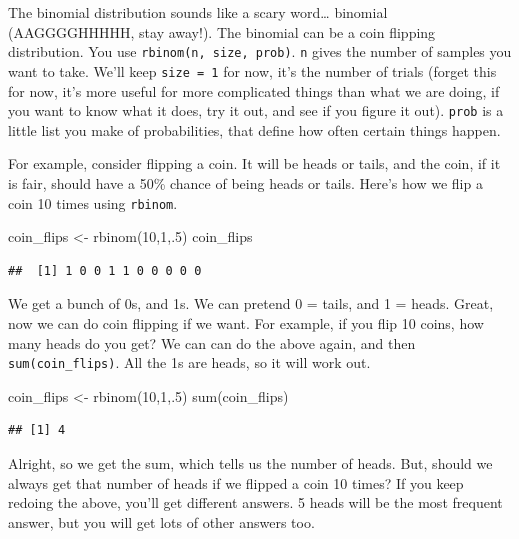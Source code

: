\documentclass[
]{book}
\newenvironment{Shaded}{\begin{snugshade}}{\end{snugshade}}
\newcommand{\DecValTok}[1]{\textcolor[rgb]{0.00,0.00,0.81}{#1}}
\newcommand{\FunctionTok}[1]{\textcolor[rgb]{0.00,0.00,0.00}{#1}}
\newcommand{\NormalTok}[1]{#1}
\newcommand{\OtherTok}[1]{\textcolor[rgb]{0.56,0.35,0.01}{#1}}
\begin{document}
The binomial distribution sounds like a scary word\ldots{} binomial (AAGGGGHHHHH, stay away!). The binomial can be a coin flipping distribution. You use \texttt{rbinom(n,\ size,\ prob)}. \texttt{n} gives the number of samples you want to take. We'll keep \texttt{size\ =\ 1} for now, it's the number of trials (forget this for now, it's more useful for more complicated things than what we are doing, if you want to know what it does, try it out, and see if you figure it out). \texttt{prob} is a little list you make of probabilities, that define how often certain things happen.

For example, consider flipping a coin. It will be heads or tails, and the coin, if it is fair, should have a 50\% chance of being heads or tails. Here's how we flip a coin 10 times using \texttt{rbinom}.

\begin{Shaded}
\begin{Highlighting}[]
\NormalTok{coin\_flips }\OtherTok{\textless{}{-}} \FunctionTok{rbinom}\NormalTok{(}\DecValTok{10}\NormalTok{,}\DecValTok{1}\NormalTok{,.}\DecValTok{5}\NormalTok{)}
\NormalTok{coin\_flips}
\end{Highlighting}
\end{Shaded}

\begin{verbatim}
##  [1] 1 0 0 1 1 0 0 0 0 0
\end{verbatim}

We get a bunch of 0s, and 1s. We can pretend 0 = tails, and 1 = heads. Great, now we can do coin flipping if we want. For example, if you flip 10 coins, how many heads do you get? We can can do the above again, and then \texttt{sum(coin\_flips)}. All the 1s are heads, so it will work out.

\begin{Shaded}
\begin{Highlighting}[]
\NormalTok{coin\_flips }\OtherTok{\textless{}{-}} \FunctionTok{rbinom}\NormalTok{(}\DecValTok{10}\NormalTok{,}\DecValTok{1}\NormalTok{,.}\DecValTok{5}\NormalTok{)}
\FunctionTok{sum}\NormalTok{(coin\_flips)}
\end{Highlighting}
\end{Shaded}

\begin{verbatim}
## [1] 4
\end{verbatim}

Alright, so we get the sum, which tells us the number of heads. But, should we always get that number of heads if we flipped a coin 10 times? If you keep redoing the above, you'll get different answers. 5 heads will be the most frequent answer, but you will get lots of other answers too.
\end{document}
